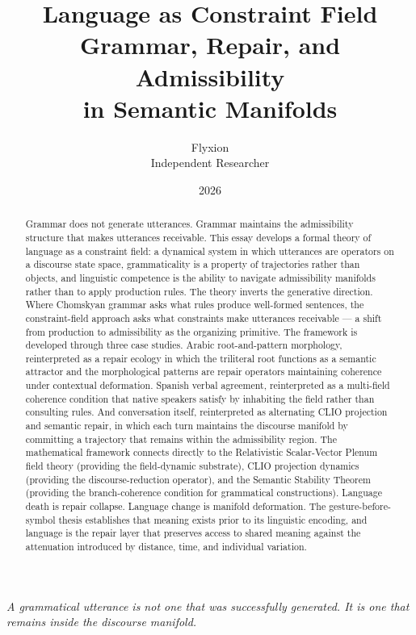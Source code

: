 \documentclass[11pt, a4paper]{article}
\title{\textbf{Language as Constraint Field}\\
{\large Grammar, Repair, and Admissibility\\
in Semantic Manifolds}}
\author{Flyxion \\ \small Independent Researcher}
\date{2026}
\theoremstyle{definition}
\theoremstyle{remark}
\begin{document}
\maketitle

\begin{abstract}
Grammar does not generate utterances. Grammar maintains the admissibility
structure that makes utterances receivable. This essay develops a formal
theory of language as a constraint field: a dynamical system in which
utterances are operators on a discourse state space, grammaticality is
a property of trajectories rather than objects, and linguistic competence
is the ability to navigate admissibility manifolds rather than to apply
production rules. The theory inverts the generative direction. Where
Chomskyan grammar asks what rules produce well-formed sentences, the
constraint-field approach asks what constraints make utterances receivable
--- a shift from production to admissibility as the organizing primitive.
The framework is developed through three case studies. Arabic root-and-pattern
morphology, reinterpreted as a repair ecology in which the triliteral root
functions as a semantic attractor and the morphological patterns are repair
operators maintaining coherence under contextual deformation. Spanish verbal
agreement, reinterpreted as a multi-field coherence condition that native
speakers satisfy by inhabiting the field rather than consulting rules. And
conversation itself, reinterpreted as alternating CLIO projection and
semantic repair, in which each turn maintains the discourse manifold by
committing a trajectory that remains within the admissibility region. The
mathematical framework connects directly to the Relativistic Scalar-Vector
Plenum field theory (providing the field-dynamic substrate), CLIO projection
dynamics (providing the discourse-reduction operator), and the Semantic
Stability Theorem (providing the branch-coherence condition for grammatical
constructions). Language death is repair collapse. Language change is manifold
deformation. The gesture-before-symbol thesis establishes that meaning exists
prior to its linguistic encoding, and language is the repair layer that
preserves access to shared meaning against the attenuation introduced by
distance, time, and individual variation.
\end{abstract}

\newpage

\epigraph{\textit{A grammatical utterance is not one that was successfully
generated. It is one that remains inside the discourse manifold.}}{}
\end{document}
